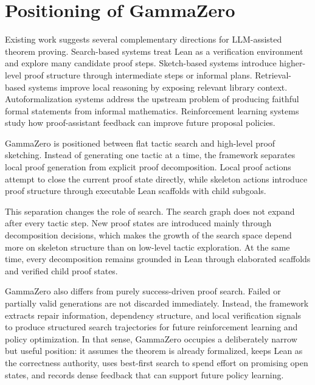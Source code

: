 \section{Positioning of GammaZero}

Existing work suggests several complementary directions for LLM-assisted theorem proving. Search-based
systems treat Lean as a verification environment and explore many candidate proof steps. Sketch-based
systems introduce higher-level proof structure through intermediate steps or informal plans.
Retrieval-based systems improve local reasoning by exposing relevant library context. Autoformalization
systems address the upstream problem of producing faithful formal statements from informal mathematics.
Reinforcement learning systems study how proof-assistant feedback can improve future proposal policies.

GammaZero is positioned between flat tactic search and high-level proof sketching. Instead of generating one tactic at a time, the framework separates local proof generation from explicit proof decomposition. Local proof actions attempt to close the current proof state directly, while skeleton actions introduce proof structure through executable Lean scaffolds with child subgoals.

This separation changes the role of search. The search graph does not expand after every tactic step. New proof states are introduced mainly through decomposition decisions, which makes the growth of the search space depend more on skeleton structure than on low-level tactic exploration. At the same time, every decomposition remains grounded in Lean through elaborated scaffolds and verified child proof states.

GammaZero also differs from purely success-driven proof search. Failed or partially valid generations are not discarded immediately. Instead, the framework extracts repair information, dependency structure, and local verification signals to produce structured search trajectories for future reinforcement learning and policy optimization. In that sense, GammaZero occupies a deliberately narrow but useful position: it assumes the theorem is already formalized, keeps Lean as the correctness authority, uses best-first search to spend effort on promising open states, and records dense feedback that can support future policy learning.
